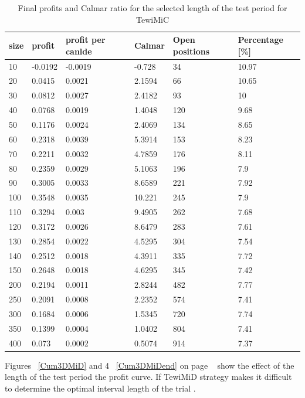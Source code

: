 \documentclass{tewiart}
\begin{document}
\begin{table}[h!] 
\caption{Final profits and Calmar ratio for the selected length of the test period for TewiMiC}
\label{table1}
 \begin{tabular}{|l|l|l|l|l|l|} 
 \hline size & profit & profit per canlde & Calmar & Open positions & Percentage [\%]\\ \hline  
10 & -0.0192 & -0.0019 & -0.728 & 34 & 10.97 \\ 
 20 & 0.0415 & 0.0021 & 2.1594 & 66 & 10.65 \\ 
 30 & 0.0812 & 0.0027 & 2.4182 & 93 & 10 \\ 
 40 & 0.0768 & 0.0019 & 1.4048 & 120 & 9.68 \\ 
 50 & 0.1176 & 0.0024 & 2.4069 & 134 & 8.65 \\ 
 60 & 0.2318 & 0.0039 & 5.3914 & 153 & 8.23 \\ 
 70 & 0.2211 & 0.0032 & 4.7859 & 176 & 8.11 \\ 
 80 & 0.2359 & 0.0029 & 5.1063 & 196 & 7.9 \\ 
 90 & 0.3005 & 0.0033 & 8.6589 & 221 & 7.92 \\ 
 100 & 0.3548 & 0.0035 & 10.221 & 245 & 7.9 \\ 
 110 & 0.3294 & 0.003 & 9.4905 & 262 & 7.68 \\ 
 120 & 0.3172 & 0.0026 & 8.6479 & 283 & 7.61 \\ 
 130 & 0.2854 & 0.0022 & 4.5295 & 304 & 7.54 \\ 
 140 & 0.2512 & 0.0018 & 4.3911 & 335 & 7.72 \\ 
 150 & 0.2648 & 0.0018 & 4.6295 & 345 & 7.42 \\ 
 200 & 0.2194 & 0.0011 & 2.8244 & 482 & 7.77 \\ 
 250 & 0.2091 & 0.0008 & 2.2352 & 574 & 7.41 \\ 
 300 & 0.1684 & 0.0006 & 1.5345 & 720 & 7.74 \\ 
 350 & 0.1399 & 0.0004 & 1.0402 & 804 & 7.41 \\ 
 400 & 0.073 & 0.0002 & 0.5074 & 914 & 7.37 \\ 
 \hline \end{tabular} 
 \end{table}
 \FloatBarrier


Figures ~\ref{Cum3DMiD} and 4 ~\ref{Cum3DMiDend} on page ~\pageref{Cum3DMiDend} show the effect of the length of the test period the profit curve. If TewiMiD strategy makes it difficult to determine the optimal interval length of the trial .
\end{document}

